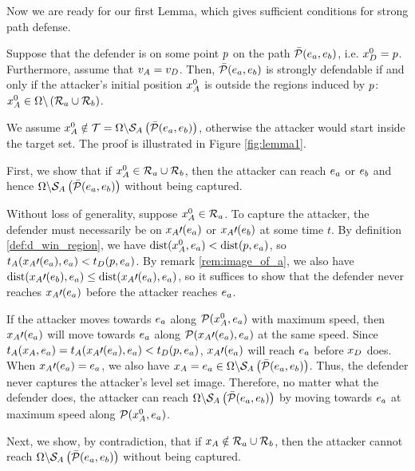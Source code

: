 Now we are ready for our first Lemma, which gives sufficient conditions for strong path defense.
\begin{lem}
\label{lem:d_winning_region}
Suppose that the defender is on some point $p$ on the path $\bar{\mathcal{P}}(e_a,e_b)$, i.e. $x_D^0 = p$. Furthermore, assume that $v_A=v_D$. Then, $\bar{\mathcal{P}}(e_a,e_b)$ is strongly defendable if and only if the attacker's initial position $x_A^0$ is outside the regions induced by $p$: $x_A^0\in\Omega\backslash\left(\mathcal{R}_a \cup \mathcal{R}_b\right)$.
\end{lem}

\begin{IEEEproof} %
We assume $x_A^0 \notin \mathcal{T} = \Omega\backslash\mathcal{S}_A\left(\bar{\mathcal{P}}(e_a,e_b)\right)$, otherwise the attacker would start inside the target set. The proof is illustrated in Figure \ref{fig:lemma1}.

First, we show that if $x_A^0\in \mathcal{R}_a \cup \mathcal{R}_b$, then the attacker can reach $e_a$ or $e_b$ and hence $\Omega\backslash\mathcal{S}_A\left(\bar{\mathcal{P}}(e_a,e_b)\right)$ without being captured. 

Without loss of generality, suppose $x_A^0\in\mathcal{R}_a$. To capture the attacker, the defender must necessarily be on $x_A\prime(e_a)$ or $x_A\prime(e_b)$ at some time $t$. By definition \ref{def:d_win_region}, we have $\text{dist}(x_A^0,e_a) < \text{dist}(p,e_a)$, so $t_A(x_A\prime(e_a),e_a) < t_D(p,e_a)$. By remark \ref{rem:image_of_a}, we also have $\text{dist}(x_A\prime(e_b),e_a) \le \text{dist}(x_A\prime(e_a),e_a)$, so it suffices to show that the defender never reaches $x_A\prime(e_a)$ before the attacker reaches $e_a$. 

If the attacker moves towards $e_a$ along $\mathcal{P}(x_A^0,e_a)$ with maximum speed, then $x_A\prime(e_a)$ will move towards $e_a$ along $\mathcal{P}(x_A\prime(e_a),e_a)$ at the same speed. Since $t_A(x_A,e_a)=t_A(x_A\prime(e_a),e_a)<t_D(p,e_a)$, $x_A\prime(e_a)$ will reach $e_a$ before $x_D$ does. When $x_A\prime(e_a)=e_a$, we also have $x_A=e_a\in\Omega\backslash\mathcal{S}_A\left(\bar{\mathcal{P}}(e_a,e_b)\right)$. Thus, the defender never captures the attacker's level set image. Therefore, no matter what the defender does, the attacker can reach $\Omega\backslash\mathcal{S}_A\left(\bar{\mathcal{P}}(e_a,e_b)\right)$ by moving towards $e_a$ at maximum speed along $\mathcal{P}(x_A^0,e_a)$.

Next, we show, by contradiction, that if $x_A\notin\mathcal{R}_a \cup \mathcal{R}_b$, then the attacker cannot reach $\Omega\backslash\mathcal{S}_A\left(\bar{\mathcal{P}}(e_a,e_b)\right)$ without being captured. 


\end{IEEEproof}
